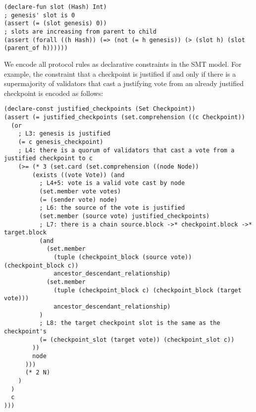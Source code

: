 \begin{lstlisting}[language=smt]
(declare-fun slot (Hash) Int)
; genesis' slot is 0
(assert (= (slot genesis) 0))
; slots are increasing from parent to child
(assert (forall ((h Hash)) (=> (not (= h genesis)) (> (slot h) (slot (parent_of h))))))
\end{lstlisting}

We encode all protocol rules as declarative constraints in the SMT model. For
example, the constraint that a checkpoint is justified if and only if there is
a supermajority of validators that cast a justifying vote from an already
justified checkpoint is encoded as follows:

\begin{lstlisting}[language=smt]
(declare-const justified_checkpoints (Set Checkpoint))
(assert (= justified_checkpoints (set.comprehension ((c Checkpoint))
  (or
    ; L3: genesis is justified
    (= c genesis_checkpoint)
    ; L4: there is a quorum of validators that cast a vote from a justified checkpoint to c
    (>= (* 3 (set.card (set.comprehension ((node Node))
        (exists ((vote Vote)) (and
          ; L4+5: vote is a valid vote cast by node
          (set.member vote votes)
          (= (sender vote) node)
          ; L6: the source of the vote is justified
          (set.member (source vote) justified_checkpoints)
          ; L7: there is a chain source.block ->* checkpoint.block ->* target.block
          (and
            (set.member
              (tuple (checkpoint_block (source vote)) (checkpoint_block c))
              ancestor_descendant_relationship)
            (set.member
              (tuple (checkpoint_block c) (checkpoint_block (target vote)))
              ancestor_descendant_relationship)
          )
          ; L8: the target checkpoint slot is the same as the checkpoint's
          (= (checkpoint_slot (target vote)) (checkpoint_slot c))
        ))
        node
      )))
      (* 2 N)
    )
  )
  c
)))
\end{lstlisting}
